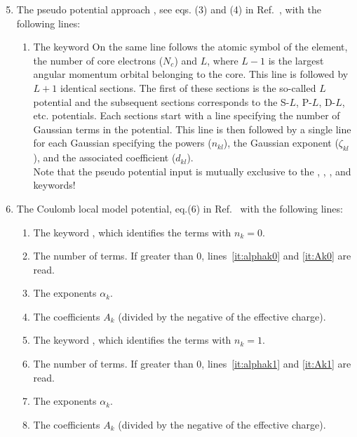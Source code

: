 \begin{enumerate}
%
%
\setcounter{enumi}{4}
%
%
\item The pseudo potential approach \cite{Kahn:68,Christiansen:79,Durand:75},
see eqs. (3) and (4) in Ref.~\cite{Skylaris:98},
with the following lines:
\begin{enumerate}
\item The keyword 
On the same line follows the atomic symbol of the element, the number of core electrons ($N_c$) and
$L$, where $L-1$ is the largest angular momentum orbital belonging to the core. This line
is followed by $L+1$ identical sections. The first of these sections is the so-called $L$ potential
and the subsequent sections corresponds to the S-$L$, P-$L$, D-$L$, etc. potentials.
Each sections start with a line specifying the number of Gaussian terms in the potential.
This line is then followed by a single line for each Gaussian specifying
the powers ($n_{kl}$), the Gaussian exponent ($\zeta_{kl}$), and the associated coefficient
($d_{kl}$).
\\
Note that the pseudo potential input is mutually exclusive to the , ,
, and  keywords!
\end{enumerate}
%
%
\item The Coulomb local model potential, eq.(6) in Ref.~\cite{Huzinaga:87}
with the following lines:
\begin{enumerate}
\item The keyword ,
which identifies the terms with $n_k=0$.
\item The number of terms.
If greater than 0, lines~\ref{it:alphak0} and \ref{it:Ak0} are read.
\item \label{it:alphak0} The exponents $\alpha_k$.
\item \label{it:Ak0} The coefficients $A_k$
(divided by the negative of the effective charge).
\item The keyword ,
which identifies the terms with $n_k=1$.
\item The number of terms.
If greater than 0, lines~\ref{it:alphak1} and \ref{it:Ak1} are read.
\item \label{it:alphak1} The exponents $\alpha_k$.
\item \label{it:Ak1} The coefficients $A_k$
(divided by the negative of the effective charge).

\end{enumerate}
\end{enumerate}
